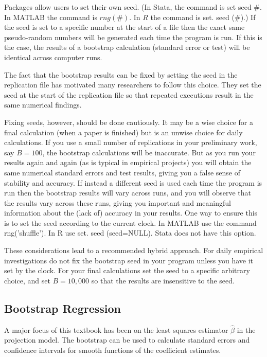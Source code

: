 \documentclass[10pt]{article}
\begin{document}
Packages allow users to set their own seed. (In Stata, the command is set seed \#. In MATLAB the command is $r n g(\#)$. In $R$ the command is set. seed (\#).) If the seed is set to a specific number at the start of a file then the exact same pseudo-random numbers will be generated each time the program is run. If this is the case, the results of a bootstrap calculation (standard error or test) will be identical across computer runs.

The fact that the bootstrap results can be fixed by setting the seed in the replication file has motivated many researchers to follow this choice. They set the seed at the start of the replication file so that repeated executions result in the same numerical findings.

Fixing seeds, however, should be done cautiously. It may be a wise choice for a final calculation (when a paper is finished) but is an unwise choice for daily calculations. If you use a small number of replications in your preliminary work, say $B=100$, the bootstrap calculations will be inaccurate. But as you run your results again and again (as is typical in empirical projects) you will obtain the same numerical standard errors and test results, giving you a false sense of stability and accuracy. If instead a different seed is used each time the program is run then the bootstrap results will vary across runs, and you will observe that the results vary across these runs, giving you important and meaningful information about the (lack of) accuracy in your results. One way to ensure this is to set the seed according to the current clock. In MATLAB use the command rng('shuffle'). In R use set. seed (seed=NULL). Stata does not have this option.

These considerations lead to a recommended hybrid approach. For daily empirical investigations do not fix the bootstrap seed in your program unless you have it set by the clock. For your final calculations set the seed to a specific arbitrary choice, and set $B=10,000$ so that the results are insensitive to the seed.

\subsection{Bootstrap Regression}
A major focus of this textbook has been on the least squares estimator $\widehat{\beta}$ in the projection model. The bootstrap can be used to calculate standard errors and confidence intervals for smooth functions of the coefficient estimates.
\end{document}

